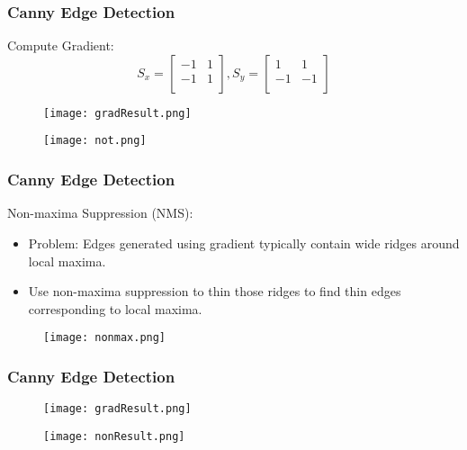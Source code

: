 \documentclass[notheorems,serif,table,compress]{beamer}  %
\begin{document}
\begin{frame}
\frametitle{Canny Edge Detection}
{\color{blue}Compute Gradient:}
    \begin{displaymath}
    S_{x}=\left[ \begin{array}{cc}
    -1 & 1 \\
    -1 & 1 \\
    \end{array} \right],
    S_{y}=\left[ \begin{array}{cc}
    1 & 1 \\
    -1 & -1 \\
    \end{array} \right]
    \end{displaymath}
    \begin{figure}
    \begin{minipage}[t]{0.45\linewidth}
    \texttt{[image: gradResult.png]} 
    \end{minipage}
    \begin{minipage}[t]{0.45\linewidth}
    \texttt{[image: not.png]} 
    \end{minipage}
    \end{figure}
\end{frame}

\begin{frame}
\frametitle{Canny Edge Detection}
{\color{blue}Non-maxima Suppression (NMS):}
\begin{itemize}
\item Problem: Edges generated using gradient typically contain wide ridges around local maxima.
\item Use non-maxima suppression to thin those ridges to find thin edges corresponding to local maxima.
\end{itemize}
    \begin{figure}
    \texttt{[image: nonmax.png]} 
    \end{figure}
\end{frame}

\begin{frame}
\frametitle{Canny Edge Detection}
    \begin{figure}
    \begin{minipage}[t]{0.45\linewidth}
    \texttt{[image: gradResult.png]} 
    \end{minipage}
    \begin{minipage}[t]{0.45\linewidth}
    \texttt{[image: nonResult.png]} 
    \end{minipage}
    \end{figure}
\end{frame}
\end{document}
